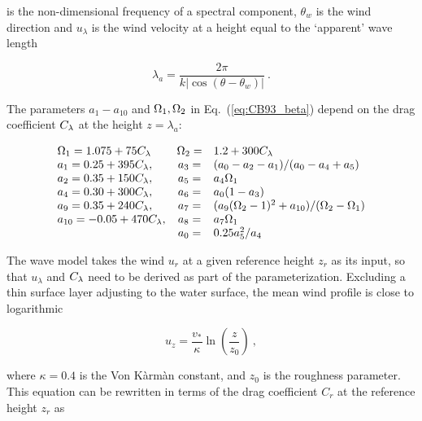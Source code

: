 \noindent
is the non-dimensional frequency of a spectral component, $\theta_w$ is the
wind direction and $u_{\lambda}$ is the wind velocity at a height equal to the
`apparent' wave length


\begin{equation}
\lambda_a = \frac{ 2 \pi }{ k | \cos(\theta-\theta_w) | }
\: . \label{eq:CB93_lam} \end{equation}

\noindent
The parameters $a_1-a_{10}$ and $\Omega_1,\Omega_2$ in Eq.~(\ref{eq:CB93_beta})
depend on the drag coefficient $C_{\lambda}$ at the height $z=\lambda_a$:


\begin{equation} \begin{array}{lcl}
\Omega_1=1.075+75C_{\lambda}  &\Omega_2=& 1.2+300C_{\lambda}                     \\
a_1=0.25+395C_{\lambda},    &a_3 =& (a_0-a_2-a_1)/(a_0-a_4+a_5)    \\
a_2=0.35+150C_{\lambda},    &a_5 =& a_4\Omega_1                       \\
a_4=0.30+300C_{\lambda},    &a_6 =& a_0(1-a_3)                     \\
a_9=0.35+240C_{\lambda},    &a_7 =&
                     (a_9(\Omega_2-1)^2+a_{10})/(\Omega_2-\Omega_1) \\
a_{10}=-0.05+470C_{\lambda},&a_8 =& a_7\Omega_1                       \\
                    &a_0 =& 0.25 a_5^2/a_4
\end{array} \label{eq:omapar} \end{equation}

\noindent
The wave model takes the wind $u_r$ at a given reference height $z_r$ as its
input, so that $u_\lambda$ and $C_{\lambda}$ need to be derived as part of the
parameterization. Excluding a thin surface layer adjusting to the water
surface, the mean wind profile is close to logarithmic


\begin{equation}
u_z = \frac{v_\ast}{\kappa} \ln \left ( \frac{z}{z_0} \right )
\: , \label{eq:u_z}
\end{equation}

\noindent
where $\kappa = 0.4 $ is the Von K\`{a}rm\`{a}n constant, and $z_0$ is the
roughness parameter. This equation can be rewritten in terms of the drag
coefficient $C_r$ at the reference height $z_r$ as \citep{art:Cha95}

